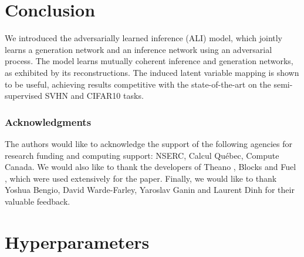 \documentclass{article}
\begin{document}
\section{Conclusion}

We introduced the adversarially learned inference (ALI) model, which jointly
learns a generation network and an inference network using an adversarial
process. The model learns mutually coherent inference and generation networks,
as exhibited by its reconstructions. The induced latent variable mapping is
shown to be useful, achieving results competitive with the state-of-the-art
on the semi-supervised SVHN and CIFAR10 tasks.

\subsubsection*{Acknowledgments}

The authors would like to acknowledge the support of the following agencies for
research funding and computing support: NSERC, Calcul Qu\'{e}bec, Compute
Canada. We would also like to thank the developers of Theano
\citep{bergstra2010theano,bastien2012theano,theano2016theano}, Blocks and Fuel
\citep{van2015blocks}, which were used extensively for the paper. Finally, we
would like to thank Yoshua Bengio, David Warde-Farley, Yaroslav Ganin and
Laurent Dinh for their valuable feedback.




\clearpage

\appendix
\section{Hyperparameters}
\end{document}
